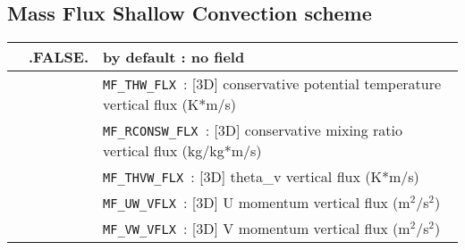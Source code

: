 \subsection{Mass Flux Shallow Convection scheme}
\begin{tabular}{|>{\centering}p{3cm}|>{\centering}p{2.5cm}|p{11cm}|}
 \hline
\multirow{6}{*}{LMFFLX}\index{LMFFLX!\innam{NAM\_DIAG}}&\textbf{.FALSE.} & by default : no field \\\cline{2-3}
 &\multirow{5}{*}{.TRUE.} & {\tt MF\_THW\_FLX }: [3D] conservative potential temperature vertical flux
 (K*m/s)\\\cline{3-3}
& &{\tt MF\_RCONSW\_FLX }: [3D] conservative mixing ratio vertical flux (kg/kg*m/s) \\\cline{3-3}
&&{\tt MF\_THVW\_FLX }: [3D] theta\_v vertical flux (K*m/s) \\ \cline{3-3}
& &{\tt MF\_UW\_VFLX }: [3D] U momentum vertical flux (m$^2$/s$^2$) \\ \cline{3-3}
& &{\tt MF\_VW\_VFLX }: [3D] V momentum vertical flux (m$^2$/s$^2$) \\ \hline
\end{tabular} 




